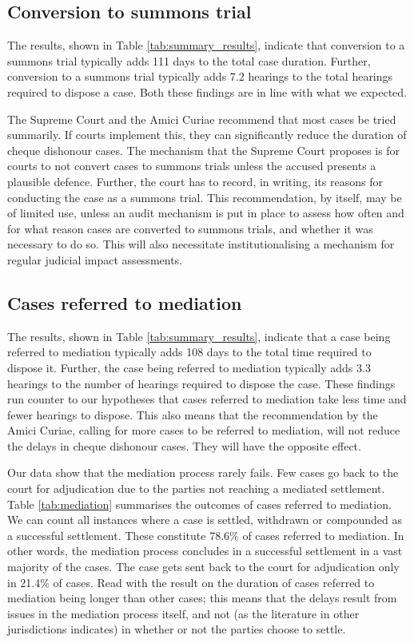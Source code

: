 \subsection{Conversion to summons trial}
\label{sec:conv -summ-trial-1}

The results, shown in Table \ref{tab:summary_results}, indicate that conversion to a summons trial typically adds 111 days to the total case duration. Further, conversion to a summons trial typically adds 7.2 hearings to the total hearings required to dispose a case. Both these findings are in line with what we expected.

The Supreme Court and the Amici Curiae recommend that most cases be tried summarily. If courts implement this, they can significantly reduce the duration of cheque dishonour cases. The mechanism that the Supreme Court proposes is for courts to not convert cases to summons trials unless the accused presents a plausible defence. Further, the court has to record, in writing, its reasons for conducting the case as a summons trial. This recommendation, by itself, may be of limited use, unless an audit mechanism is put in place to assess how often and for what reason cases are converted to summons trials, and whether it was necessary to do so. This will also necessitate institutionalising a mechanism for regular judicial impact assessments.

\subsection{Cases referred to mediation}
\label{sec:mediation}

The results, shown in Table \ref{tab:summary_results}, indicate that a case being referred to mediation typically adds 108 days to the total time required to dispose it. Further, the case being referred to mediation typically adds 3.3 hearings to the number of hearings required to dispose the case. These findings run counter to our hypotheses that cases referred to mediation take less time and fewer hearings to dispose. This also means that the recommendation by the Amici Curiae, calling for more cases to be referred to mediation, will not reduce the delays in cheque dishonour cases. They will have the opposite effect.

Our data show that the mediation process rarely fails. Few cases go back to the court for adjudication due to the parties not reaching a mediated settlement. Table \ref{tab:mediation} summarises the outcomes of cases referred to mediation. We can count all instances where a case is settled, withdrawn or compounded as a successful settlement. These constitute 78.6\% of cases referred to mediation. In other words, the mediation process concludes in a successful settlement in a vast majority of the cases. The case gets sent back to the court for adjudication only in 21.4\% of cases. Read with the result on the duration of cases referred to mediation being longer than other cases; this means that the delays result from issues in the mediation process itself, and not (as the literature in other jurisdictions indicates) in whether or not the parties choose to settle.

